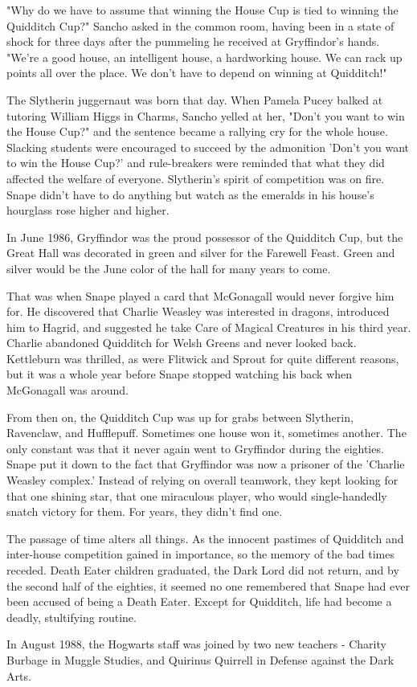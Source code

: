 \documentclass[a4paper,11pt]{article}
\begin{document}
"Why do we have to assume that winning the House Cup is tied to winning the Quidditch Cup?" Sancho asked in the common room, having been in a state of shock for three days after the pummeling he received at Gryffindor's hands. "We're a good house, an intelligent house, a hardworking house. We can rack up points all over the place. We don't have to depend on winning at Quidditch!"

The Slytherin juggernaut was born that day. When Pamela Pucey balked at tutoring William Higgs in Charms, Sancho yelled at her, "Don't you want to win the House Cup?" and the sentence became a rallying cry for the whole house. Slacking students were encouraged to succeed by the admonition 'Don't you want to win the House Cup?' and rule-breakers were reminded that what they did affected the welfare of everyone. Slytherin's spirit of competition was on fire. Snape didn't have to do anything but watch as the emeralds in his house's hourglass rose higher and higher.

In June 1986, Gryffindor was the proud possessor of the Quidditch Cup, but the Great Hall was decorated in green and silver for the Farewell Feast. Green and silver would be the June color of the hall for many years to come.

That was when Snape played a card that McGonagall would never forgive him for. He discovered that Charlie Weasley was interested in dragons, introduced him to Hagrid, and suggested he take Care of Magical Creatures in his third year. Charlie abandoned Quidditch for Welsh Greens and never looked back. Kettleburn was thrilled, as were Flitwick and Sprout for quite different reasons, but it was a whole year before Snape stopped watching his back when McGonagall was around.

From then on, the Quidditch Cup was up for grabs between Slytherin, Ravenclaw, and Hufflepuff. Sometimes one house won it, sometimes another. The only constant was that it never again went to Gryffindor during the eighties. Snape put it down to the fact that Gryffindor was now a prisoner of the 'Charlie Weasley complex.' Instead of relying on overall teamwork, they kept looking for that one shining star, that one miraculous player, who would single-handedly snatch victory for them. For years, they didn't find one.

The passage of time alters all things. As the innocent pastimes of Quidditch and inter-house competition gained in importance, so the memory of the bad times receded. Death Eater children graduated, the Dark Lord did not return, and by the second half of the eighties, it seemed no one remembered that Snape had ever been accused of being a Death Eater. Except for Quidditch, life had become a deadly, stultifying routine.

In August 1988, the Hogwarts staff was joined by two new teachers - Charity Burbage in Muggle Studies, and Quirinus Quirrell in Defense against the Dark Arts.
\end{document}
